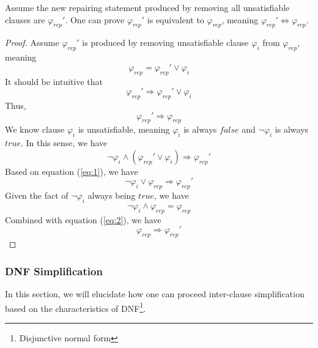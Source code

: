 Assume the new repairing statement produced by removing all unsatisfiable clauses are $\varphi _{rep}'$.
One can prove $\varphi _{rep}'$ is equivalent to $\varphi _{rep}$, meaning $\varphi _{rep}' \Longleftrightarrow \varphi _{rep}$.

\begin{proof}
Assume $\varphi _{rep}'$ is produced by removing unsatisfiable clause $\varphi _{i}$ from $\varphi _{rep}$, meaning
\begin{equation}
\label{eq:1}
\varphi _{rep} = \varphi _{rep}' \vee \varphi _{i}
\end{equation}
It should be intuitive that
\begin{equation}
\varphi _{rep}' \Longrightarrow \varphi _{rep}' \vee \varphi _{i}
\end{equation}
Thus,
\begin{equation}
\varphi _{rep}' \Longrightarrow \varphi _{rep}
\end{equation}
We know clause $\varphi _{i}$ is unsatisfiable, meaning $\varphi _{i}$ is always $false$ and $\neg \varphi _{i}$ is always $true$. In this sense, we have
\begin{equation}
\neg \varphi _{i} \wedge (\varphi _{rep}' \vee \varphi _{i}) \Longrightarrow \varphi _{rep}'
\end{equation}
Based on equation (\ref{eq:1}), we have
\begin{equation}
\label{eq:2}
\neg \varphi _{i} \vee \varphi _{rep} \Longrightarrow \varphi _{rep}'
\end{equation}
Given the fact of $\neg \varphi _{i}$ always being $true$, we have
\begin{equation}
\neg \varphi _{i} \wedge \varphi _{rep} = \varphi _{rep}
\end{equation}
Combined with equation (\ref{eq:2}), we have
\begin{equation}
\varphi _{rep} \Longrightarrow \varphi _{rep}'
\end{equation}
\end{proof}

\subsubsection{DNF Simplification}
In this section, we will elucidate how one can proceed inter-clause simplification based on the characteristics of DNF\footnote{Disjunctive normal form}.

